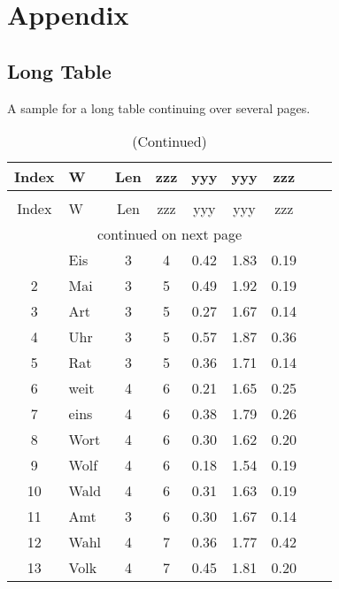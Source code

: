 \chapter{Appendix}
\label{apx:appendix}

\section{Long Table}
\label{apx:longtable}

A sample for a long table continuing over several pages.

{\scriptsize
\begin{longtable}{clccccccc}
\caption[Long Table]{Long table that is bla bla bla.}\\
\toprule
Index & W & Len & zzz & yyy & yyy & zzz \\
\midrule
\endfirsthead
\caption[]{(Continued)}\\
\toprule
Index & W & Len & zzz & yyy & yyy & zzz \\
\midrule
\endhead
\midrule
\multicolumn{9}{c}{continued on next page}\\
\bottomrule
\endfoot
\endlastfoot
\hline
1 & Eis & 3 & 4 & 0.42 & 1.83 & 0.19 \\ \hline
2 & Mai & 3 & 5 & 0.49 & 1.92 & 0.19 \\ \hline
3 & Art & 3 & 5 & 0.27 & 1.67 & 0.14 \\ \hline
4 & Uhr & 3 & 5 & 0.57 & 1.87 & 0.36 \\ \hline
5 & Rat & 3 & 5 & 0.36 & 1.71 & 0.14 \\ \hline
6 & weit & 4 & 6 & 0.21 & 1.65 & 0.25 \\ \hline
7 & eins & 4 & 6 & 0.38 & 1.79 & 0.26 \\ \hline
8 & Wort & 4 & 6 & 0.30 & 1.62 & 0.20 \\ \hline
9 & Wolf & 4 & 6 & 0.18 & 1.54 & 0.19 \\ \hline
10 & Wald & 4 & 6 & 0.31 & 1.63 & 0.19 \\ \hline
11 & Amt & 3 & 6 & 0.30 & 1.67 & 0.14 \\ \hline
12 & Wahl & 4 & 7 & 0.36 & 1.77 & 0.42 \\ \hline
13 & Volk & 4 & 7 & 0.45 & 1.81 & 0.20 \\ \hline

\end{longtable}}
